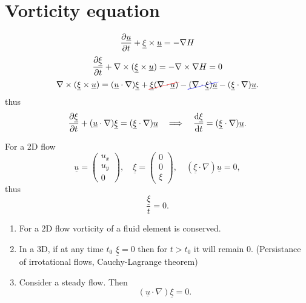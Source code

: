\documentclass[11pt,oneside]{book}
\renewcommand{\vec}[1]{\underline{#1}}
\theoremstyle{definition} %
\theoremstyle{plain} %
\theoremstyle{remark} %
\theoremstyle{underline}
\newcommand\Ccancel[2][black]{
    \let\OldcancelColor\CancelColor
    \renewcommand\CancelColor{\color{#1}}
    \cancel{#2}
    \renewcommand\CancelColor{\OldcancelColor}
}
\let\OldcancelColor\CancelColor
\renewcommand\CancelColor{\color{#1}}
\renewcommand\CancelColor{\OldcancelColor}
\begin{document}
  \section{Vorticity equation}
  \begin{displaymath}
    \ptf{\vec u}{t} + \vec \xi \times \vec u = - \nabla H
  \end{displaymath}
  \begin{displaymath}
    \ptf{\vec \xi}{t} + \nabla \times (\vec \xi \times \vec u) = - \nabla \times \nabla H = 0
  \end{displaymath}
  \begin{displaymath}
    \nabla \times(\vec \xi \times\vec u )  = (\vec u \cdot \nabla) \vec \xi + 
    \Ccancel[red]{\vec \xi (\nabla \cdot \vec u)} - \Ccancel[blue]{(\nabla \cdot \vec \xi) \vec u} - (\vec \xi \cdot \nabla ) \vec u.
  \end{displaymath}
  thus
  \begin{displaymath}
    \ptf{\vec \xi}{t} + (\vec u\cdot \nabla ) \vec \xi = (\vec \xi \cdot \nabla)\vec u 
    \qLRa \dfrac{\vec \xi}{t} = (\vec \xi \cdot \nabla) \vec u.
  \end{displaymath}

  For a 2D flow
  \begin{displaymath}
    \vec u = \begin{pmatrix}
      u_x\\
      u_y\\
      0
    \end{pmatrix}, \quad 
    \vec \xi = \begin{pmatrix}
      0\\
      0\\
      \xi
    \end{pmatrix}, \quad (\vec \xi \cdot \nabla) \vec u = 0, 
  \end{displaymath}
  thus
  \begin{displaymath}
    \dfrac{\vec \xi}{t} = 0.
  \end{displaymath}

  \begin{enumerate}
    \item For a $2$D flow vorticity of a fluid element is conserved.
    \item In a 3D, if at any time $t_0$ $\vec \xi =0$ then for $t> t_0$ it will remain $0$.
      (Persistance of irrotational flows, Cauchy-Lagrange theorem)
    \item Consider a steady flow. Then 
      \begin{displaymath}
        (\vec u \cdot \nabla) \vec \xi = 0.
      \end{displaymath}
      
  \end{enumerate}
\end{document}
